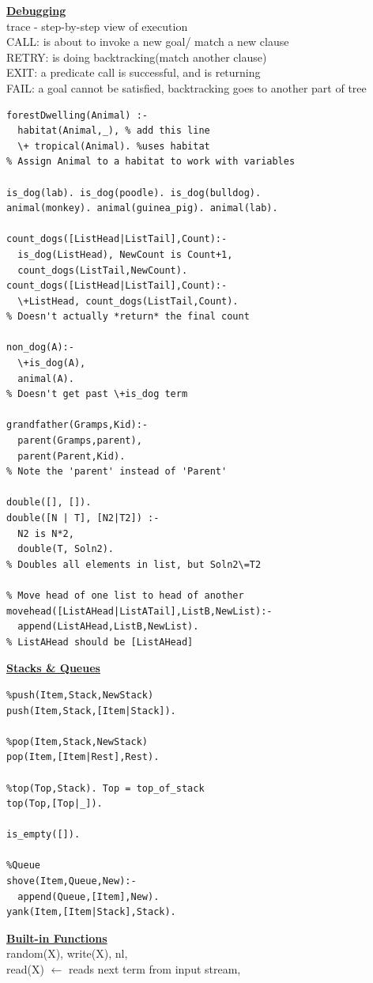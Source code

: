 \documentclass[8pt,letterpaper,twocolumn]{article}
\begin{document}
\underline{\textbf{Debugging}}\\
trace - step-by-step view of execution\\
CALL: is about to invoke a new goal/ match a new clause\\
RETRY: is doing backtracking(match another clause)\\
EXIT: a predicate call is successful, and is returning\\
FAIL: a goal cannot be satisfied, backtracking goes to another part of tree
\begin{verbatim}
forestDwelling(Animal) :-
  habitat(Animal,_), % add this line
  \+ tropical(Animal). %uses habitat
% Assign Animal to a habitat to work with variables

is_dog(lab). is_dog(poodle). is_dog(bulldog).
animal(monkey). animal(guinea_pig). animal(lab).

count_dogs([ListHead|ListTail],Count):-
  is_dog(ListHead), NewCount is Count+1,
  count_dogs(ListTail,NewCount).
count_dogs([ListHead|ListTail],Count):-
  \+ListHead, count_dogs(ListTail,Count).
% Doesn't actually *return* the final count

non_dog(A):-
  \+is_dog(A),
  animal(A).
% Doesn't get past \+is_dog term

grandfather(Gramps,Kid):-
  parent(Gramps,parent),
  parent(Parent,Kid).
% Note the 'parent' instead of 'Parent'

double([], []).
double([N | T], [N2|T2]) :-
  N2 is N*2,
  double(T, Soln2).
% Doubles all elements in list, but Soln2\=T2

% Move head of one list to head of another
movehead([ListAHead|ListATail],ListB,NewList):-
  append(ListAHead,ListB,NewList).
% ListAHead should be [ListAHead]
\end{verbatim}
\underline{\textbf{Stacks \& Queues}}
\begin{verbatim}
%push(Item,Stack,NewStack)
push(Item,Stack,[Item|Stack]).

%pop(Item,Stack,NewStack)
pop(Item,[Item|Rest],Rest).

%top(Top,Stack). Top = top_of_stack
top(Top,[Top|_]).

is_empty([]).

%Queue
shove(Item,Queue,New):-
  append(Queue,[Item],New).
yank(Item,[Item|Stack],Stack).
\end{verbatim}
\underline{\textbf{Built-in Functions}}\\
random(X), write(X), nl,\\
read(X) $\leftarrow$ reads next term from input stream,\\
\end{document}
